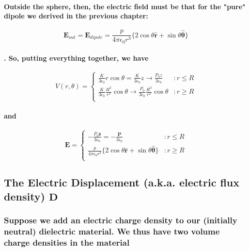 \documentclass{article}
\begin{document}
\paragraph{Outside the sphere, then, the electric field must be that for the "pure" dipole we derived in the previous chapter:}
\begin{equation*}
    \boldsymbol{E}_{out}=\boldsymbol{E}_{dipole}=\frac{p}{4\pi\epsilon_0 r^3}\{ 2\cos\theta \hat{\boldsymbol{r}}+\sin\theta\hat{\boldsymbol{\theta}}\}
\end{equation*}
\paragraph{. So, putting everything together, we have}
\begin{equation*}
    V(r,\theta)= \begin{cases}
        \frac{K}{3\epsilon_0}r\cos\theta=\frac{K}{3\epsilon_0}z\rightarrow\frac{P_0z}{3\epsilon_0} & :r\leq R\\
        \frac{K}{3\epsilon_0}\frac{R^3}{r^2}\cos\theta\rightarrow\frac{P_0}{3\epsilon_0}\frac{R^3}{r^2}\cos\theta & :r\geq R\\
    \end{cases}
\end{equation*}
\paragraph{and}
\begin{equation*}
    \boldsymbol{E}=\begin{cases}
        -\frac{P_0\hat{\boldsymbol{z}}}{3\epsilon_0}=-\frac{\boldsymbol{P}}{3\epsilon_0} & :r\leq R\\
        \frac{p}{4\pi\epsilon_0 r^3}\{ 2\cos\theta \hat{\boldsymbol{r}}+\sin\theta\hat{\boldsymbol{\theta}}\} & : r\geq R\\
    \end{cases}
\end{equation*}
\subsection{The Electric Displacement (a.k.a. electric flux density) $\boldsymbol{D}$}
\subsubsection{Suppose we add an electric charge density to our (initially neutral) dielectric material. We thus have two volume charge densities in the material}
\end{document}
